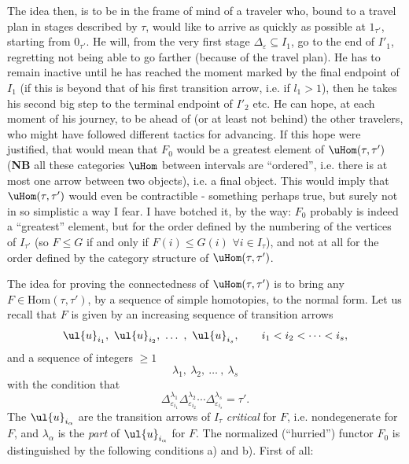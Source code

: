 
The idea then, is to be in the frame of mind of a traveler who, bound to a travel plan in stages described by $\tau$, would like to arrive as quickly as possible at $1_{\tau'}$, starting from $0_{\tau'}$. He will, from the very first stage $\Delta_\varepsilon\subseteq I_1$, go to the end of $I'_1$, regretting not being able to go farther (because of the travel plan). He has to remain inactive until he has reached the moment marked by the final endpoint of $I_1$ (if this is beyond that of his first transition arrow, i.e. if $l_1>1$), then he takes his second big step to the terminal endpoint of $I'_2$ etc. He can hope, at each moment of his journey, to be ahead of (or at least not behind) the other travelers, who might have followed different tactics for advancing. If this hope were justified, that would mean that $F_0$ would be a greatest element of $\uHom(\tau,\tau')$ (\textbf{NB} all these categories $\uHom$ between intervals are ``ordered'', i.e. there is at most one arrow between two objects), i.e. a final object. This would imply that $\uHom(\tau,\tau')$ would even be contractible - something perhaps true, but surely not in so simplistic a way I fear. I have botched it, by the way: $F_0$ probably is indeed a ``greatest'' element, but for the order defined by the numbering of the vertices of $I_{\tau'}$ (so $F\leq G$ if and only if $F(i)\leq G(i)$ $\forall i\in I_\tau$), and not at all for the order defined by the category structure of $\uHom(\tau,\tau')$.

The idea for proving the connectedness of $\uHom(\tau,\tau')$ is to bring any $F\in\mathrm{Hom}(\tau,\tau')$, by a sequence of simple homotopies, to the normal form. Let us recall that $F$ is given by an increasing sequence of transition arrows
\[
\ul{u}_{i_1},\ \ul{u}_{i_2},\ \dots\ ,\ \ul{u}_{i_s},\qquad i_1<i_2<\cdots<i_s,
\]
and a sequence of integers $\geq1$
\[
\lambda_1,\ \lambda_2,\ \dots\ ,\ \lambda_s
\]
with the condition that
\[
\Delta^{\lambda_1}_{\varepsilon_{i_1}}\Delta^{\lambda_2}_{\varepsilon_{i_2}}\cdots\Delta^{\lambda_s}_{\varepsilon_{i_s}}=\tau'. \tag*{$(*)$}
\]
The $\ul{u}_{i_\alpha}$ are the transition arrows of $I_\tau$ \textit{critical} for $F$, i.e. nondegenerate for $F$, and $\lambda_\alpha$ is the \textit{part} of $\ul{u}_{i_\alpha}$ for $F$. The normalized (``hurried'') functor $F_0$ is distinguished by the following conditions a) and b). First of all:

